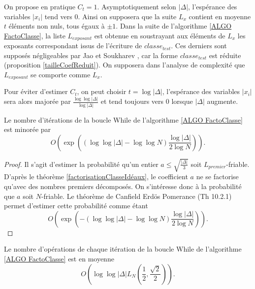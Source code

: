 \begin{Rem}\label{comportementListeExposant}
	On propose en pratique $C_{t} = 1$. Asymptotiquement selon $|\Delta|$, l'espérance des variables $|x_{i}|$ tend vers $0$. Ainsi on supposera que la suite $L_{x}$ contient en moyenne $t$ éléments non nuls, tous égaux à $\pm 1$. Dans la suite de l'algorithme \ref{ALGO FactoClasse}, la liste $L_{exposant}$ est obtenue en soustrayant aux éléments de $L_{x}$ les exposants correspondant issus de l'écriture de $classe_{test}$. Ces derniers sont supposés négligeables par Jao et Soukharev \cite{JaoSoukharev}, car la forme $classe_{test}$ est réduite (proposition \ref{tailleCoefReduit}). On supposera dans l'analyse de complexité que $L_{exposant}$ se comporte comme $L_{x}$. 
\end{Rem}

\begin{Rem}
	Pour éviter d'estimer $C_{t}$, on peut choisir $t = \log|\Delta|$, l'espérance des variables $|x_i|$ sera alors majorée par $\frac{\log\log|\Delta|}{\log|\Delta|}$ et tend toujours vers $0$ lorsque $|\Delta|$ augmente. 
\end{Rem}

\begin{Prop}\label{minorationNombreEssaisFacto}
	Le nombre d'itérations de la boucle While de l'algorithme \ref{ALGO FactoClasse} est minorée par 
	\begin{equation*}
		O\left( \exp \left( \left( \log\log|\Delta|  - \log\log N \right)\frac{\log|\Delta|}{2\log N} \right) \right).
	\end{equation*}
\end{Prop}

\begin{proof}
	Il s'agit d'estimer la probabilité qu'un entier $a \leq \sqrt{\frac{|\Delta|}{3}}$ soit $L_{premier}$-friable. D'après le théorème \ref{factorisationClasseIdéaux}, le coefficient $a$ ne se factorise qu'avec des nombres premiers décomposés. On s'intéresse donc à la probabilité que $a$ soit $N$-friable. Le théorème de Canfield Erdös Pomerance  \cite{Coh00}(Th 10.2.1) permet d'estimer cette probabilité comme étant 
	\begin{equation*}
		O\left( \exp \left( -\left( \log\log|\Delta|  - \log\log N  \right)\frac{\log|\Delta|}{2\log N} \right) \right).
	\end{equation*}
\end{proof}

\begin{Prop}\label{Complex iterationBoucleWhile}
	Le nombre d'opérations de chaque itération de la boucle While de l'algorithme \ref{ALGO FactoClasse} est en moyenne 
	\begin{equation*}
		O\left(\log\log|\Delta|L_{N}\left( \frac{1}{2},\frac{\sqrt{2}}{2}\right) \right).
	\end{equation*}
\end{Prop}

